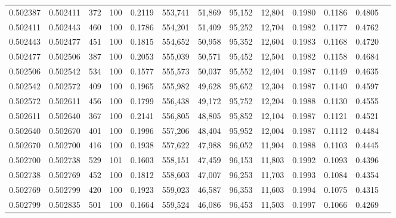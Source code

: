 \begin{tabular}{rrrrrrrrrrrrr}
0.502387 & 0.502411 &   372 & 100 &                                     0.2119 & 553,741 &  51,869 &  95,152 &  12,804 & 0.1980 & 0.1186 & 0.4805 \\
0.502411 & 0.502443 &   460 & 100 &                                     0.1786 & 554,201 &  51,409 &  95,252 &  12,704 & 0.1982 & 0.1177 & 0.4762 \\
0.502443 & 0.502477 &   451 & 100 &                                     0.1815 & 554,652 &  50,958 &  95,352 &  12,604 & 0.1983 & 0.1168 & 0.4720 \\
0.502477 & 0.502506 &   387 & 100 &                                     0.2053 & 555,039 &  50,571 &  95,452 &  12,504 & 0.1982 & 0.1158 & 0.4684 \\
0.502506 & 0.502542 &   534 & 100 &                                     0.1577 & 555,573 &  50,037 &  95,552 &  12,404 & 0.1987 & 0.1149 & 0.4635 \\
0.502542 & 0.502572 &   409 & 100 &                                     0.1965 & 555,982 &  49,628 &  95,652 &  12,304 & 0.1987 & 0.1140 & 0.4597 \\
0.502572 & 0.502611 &   456 & 100 &                                     0.1799 & 556,438 &  49,172 &  95,752 &  12,204 & 0.1988 & 0.1130 & 0.4555 \\
0.502611 & 0.502640 &   367 & 100 &                                     0.2141 & 556,805 &  48,805 &  95,852 &  12,104 & 0.1987 & 0.1121 & 0.4521 \\
0.502640 & 0.502670 &   401 & 100 &                                     0.1996 & 557,206 &  48,404 &  95,952 &  12,004 & 0.1987 & 0.1112 & 0.4484 \\
0.502670 & 0.502700 &   416 & 100 &                                     0.1938 & 557,622 &  47,988 &  96,052 &  11,904 & 0.1988 & 0.1103 & 0.4445 \\
0.502700 & 0.502738 &   529 & 101 &                                     0.1603 & 558,151 &  47,459 &  96,153 &  11,803 & 0.1992 & 0.1093 & 0.4396 \\
0.502738 & 0.502769 &   452 & 100 &                                     0.1812 & 558,603 &  47,007 &  96,253 &  11,703 & 0.1993 & 0.1084 & 0.4354 \\
0.502769 & 0.502799 &   420 & 100 &                                     0.1923 & 559,023 &  46,587 &  96,353 &  11,603 & 0.1994 & 0.1075 & 0.4315 \\
0.502799 & 0.502835 &   501 & 100 &                                     0.1664 & 559,524 &  46,086 &  96,453 &  11,503 & 0.1997 & 0.1066 & 0.4269 \\

\end{tabular}
